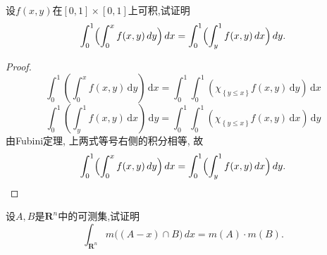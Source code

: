 \documentclass[../main.tex]{subfiles}
\begin{document}
\begin{exercise}{}{}
设$f(x,y)$在$[0,1]\times[0,1]$上可积,试证明
\[
\int_0^1\Bigl(\int_0^x f(x,y)\,dy\Bigr)\,dx
=
\int_0^1\Bigl(\int_y^1 f(x,y)\,dx\Bigr)\,dy.
\]
\end{exercise}

\begin{proof}
    \[
    \int_{0}^{1}\left( \int_{0}^{x}f\left( x,y \right)\,\mathrm{d} y  \right)\,\mathrm{d} x=  \int_{0}^{1}\int_{0}^{1}\left( \chi _{\left\{ y\le x \right\}}f\left( x,y \right)\,\mathrm{d} y  \right)\,\mathrm{d} x  
    \] \[
    \int_{0}^{1}\left( \int_{y}^{1}f\left( x,y \right)\,\mathrm{d} x  \right)\,\mathrm{d} y= \int_{0}^{1}\int_{0}^{1}\left( \chi _{\left\{ y\le x \right\}}f\left( x,y \right)\,\mathrm{d} x  \right)\,\mathrm{d} y  
    \]由Fubini定理, 上两式等号右侧的积分相等, 故
\[
\int_0^1\Bigl(\int_0^x f(x,y)\,dy\Bigr)\,dx
=
\int_0^1\Bigl(\int_y^1 f(x,y)\,dx\Bigr)\,dy.
\]
\end{proof}

\begin{exercise}{}{}
设$A,B$是$\mathbf{R}^n$中的可测集,试证明
\[
\int_{\mathbf{R}^n} m\bigl((A-x)\cap B\bigr)\,dx
=
m(A)\cdot m(B).
\]
\end{exercise}
\end{document}

